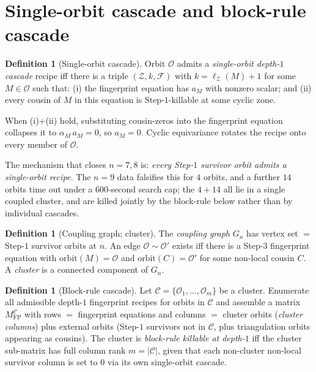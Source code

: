 \documentclass[11pt]{article}
\theoremstyle{definition}
\newtheorem{defn}[thm]{Definition}
\begin{document}
\section{Single-orbit cascade and block-rule cascade}\label{sec:cascades}

\begin{defn}[Single-orbit cascade]\label{def:single}
Orbit $\mathcal O$ admits a \emph{single-orbit depth-$1$ cascade}
recipe iff there is a triple $(\mathcal Z, k, \mathcal F)$ with
$k=\ell_{\mathcal Z}(M)+1$ for some $M\in\mathcal O$ such that:
(i) the fingerprint equation has $a_M$ with nonzero scalar; and
(ii) every cousin of $M$ in this equation is Step-$1$-killable at
some cyclic zone.
\end{defn}

When (i)+(ii) hold, substituting cousin-zeros into the fingerprint
equation collapses it to $\alpha_M\,a_M=0$, so $a_M=0$. Cyclic
equivariance rotates the recipe onto every member of $\mathcal O$.

The mechanism that closes $n=7,8$ is: \emph{every Step-$1$ survivor
orbit admits a single-orbit recipe.} The $n=9$ data falsifies this
for $4$ orbits, and a further $14$ orbits time out under a $600$-second
search cap; the $4+14$ all lie in a single coupled cluster, and are
killed jointly by the block-rule below rather than by individual
cascades.

\begin{defn}[Coupling graph; cluster]\label{def:coupling}
The \emph{coupling graph} $G_n$ has vertex set $=$ Step-$1$ survivor
orbits at $n$. An edge $\mathcal O \sim \mathcal O'$ exists iff there
is a Step-$3$ fingerprint equation with $\mathrm{orbit}(M)
=\mathcal O$ and $\mathrm{orbit}(C)=\mathcal O'$ for some non-local
cousin $C$. A \emph{cluster} is a connected component of $G_n$.
\end{defn}

\begin{defn}[Block-rule cascade]\label{def:block-rule}
Let $\mathcal C=\{\mathcal O_1,\dots,\mathcal O_m\}$ be a cluster.
Enumerate all admissible depth-$1$ fingerprint recipes for orbits in
$\mathcal C$ and assemble a matrix $M_{\mathrm{FP}}^{\mathcal C}$
with rows $=$ fingerprint equations and columns $=$ cluster orbits
(\emph{cluster columns}) plus external orbits (Step-$1$ survivors
not in $\mathcal C$, plus triangulation orbits appearing as cousins).
The cluster is \emph{block-rule killable at depth-$1$} iff the
cluster sub-matrix has full column rank $m=|\mathcal C|$, given that
each non-cluster non-local survivor column is set to $0$ via its own
single-orbit cascade.
\end{defn}
\end{document}
